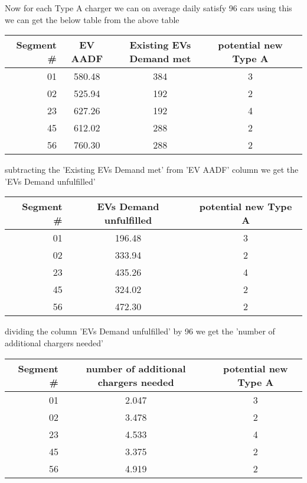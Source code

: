 \documentclass[12pt,letterpaper]{article}
\begin{document}
\begin{itemize}
        Now for each Type A charger we can on average daily satisfy 96 cars using this we can get the below table from the above table
        \begin{center}
            \begin{tabular}{r|cccc}
                 Segment \# & EV AADF & Existing EVs Demand met & potential new Type A \\ \hline
                 01 & 580.48 & 384 & 3  \\
                 02 & 525.94 & 192 & 2  \\ 
                 23 & 627.26 & 192 & 4  \\
                 45 & 612.02 & 288 & 2  \\
                 56 & 760.30 & 288 & 2  \\
            \end{tabular}
        \end{center}
        subtracting the 'Existing EVs Demand met' from 'EV AADF' column we get the 'EVs Demand unfulfilled'
        \begin{center}
            \begin{tabular}{r|cc}
                 Segment \# & EVs Demand unfulfilled & potential new Type A \\ \hline
                 01 & 196.48 & 3  \\
                 02 & 333.94 & 2  \\ 
                 23 & 435.26 & 4  \\
                 45 & 324.02 & 2  \\
                 56 & 472.30 & 2  \\
            \end{tabular}
        \end{center}
        dividing the column 'EVs Demand unfulfilled' by 96 we get the 'number of additional chargers needed'
        \begin{center}
            \begin{tabular}{r|cc}
                 Segment \# & number of additional chargers needed & potential new Type A \\ \hline
                 01 & 2.047 & 3  \\
                 02 & 3.478 & 2  \\ 
                 23 & 4.533 & 4  \\
                 45 & 3.375 & 2  \\
                 56 & 4.919 & 2  \\

\end{tabular}
\end{center}
\end{itemize}
\end{document}
